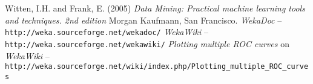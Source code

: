\documentclass[a4paper]{article}
\begin{document}
\newpage
\begin{thebibliography}{999}
	 Witten, I.H. and Frank, E. (2005) \textit{Data Mining: Practical machine
learning tools and techniques. 2nd edition}  Morgan Kaufmann, San
Francisco.
	 \textit{WekaDoc} -- \texttt{http://weka.sourceforge.net/wekadoc/}
	 \textit{WekaWiki} -- \texttt{http://weka.sourceforge.net/wekawiki/}
	 \textit{Plotting multiple ROC curves} on \textit{WekaWiki} -- \\
\small{\texttt{http://weka.sourceforge.net/wiki/index.php/Plotting\_multiple\_ROC\_curves}}
\end{thebibliography}
\end{document}
